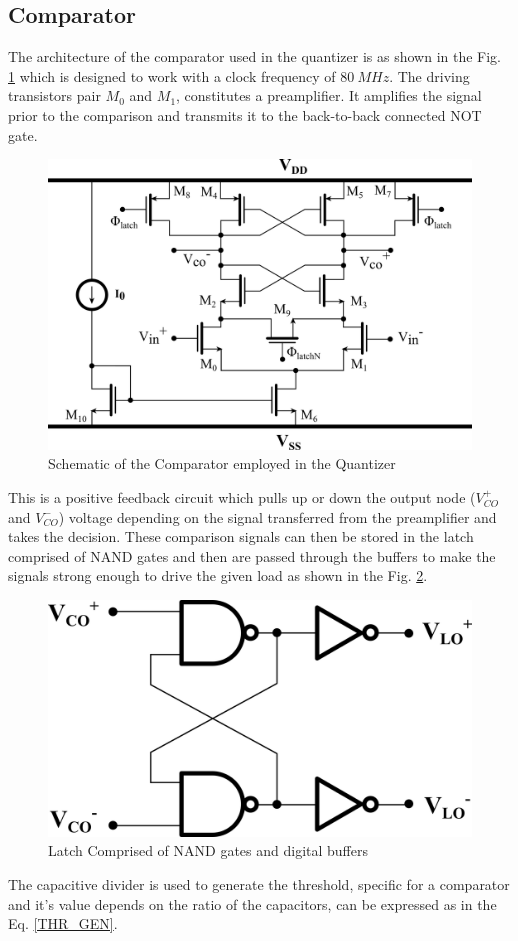\subsection{Comparator}
The architecture of the comparator used in the quantizer is as shown in the Fig. \ref{COMP} which is designed to work with a clock frequency of $80\ MHz$. The driving transistors pair $M_{0}$ and $M_{1}$, constitutes a preamplifier. It amplifies the signal prior to the comparison and transmits it to the back-to-back connected NOT gate.
\begin{figure}[h!]
\centering
\includegraphics[width=0.8\columnwidth]{Chap05/Figures/comparator.png}
\caption{Schematic of the Comparator employed in the Quantizer}
\label{COMP}
\end{figure}
 This is a positive feedback circuit which pulls up or down the output node ($V_{CO}^+$ and $V_{CO}^-$) voltage depending on the signal transferred from the preamplifier and takes the decision.
These comparison signals can then be stored in the latch comprised of NAND gates and then are passed through the buffers to make the signals strong enough to drive the given load as shown in the Fig. \ref{LATCH}.
\begin{figure}[h!]
\centering
\includegraphics[width=0.5\columnwidth]{Chap05/Figures/latch.png}
\caption{Latch Comprised of NAND gates and digital buffers}
\label{LATCH}
\end{figure}
The capacitive divider is used to generate the threshold, specific for a comparator and it's value depends on the ratio of the capacitors, can be expressed as in the Eq. \ref{THR_GEN}.

